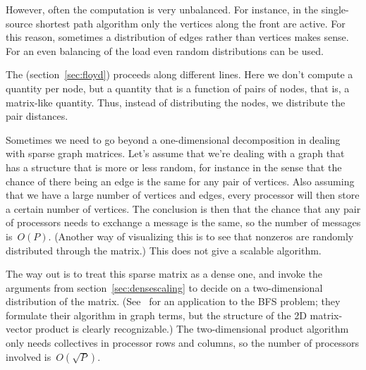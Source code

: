 However, often the computation is very unbalanced. For instance,
in the single-source shortest path algorithm only the vertices
along the front are active. For this reason, sometimes a distribution
of edges rather than vertices makes sense. For an even balancing
of the load even random distributions can be used.

The 
(section~\ref{sec:floyd}) proceeds along different lines. Here we don't
compute a quantity per node, but a quantity that is a function of pairs
of nodes, that is, a matrix-like quantity. Thus, instead of distributing
the nodes, we distribute the pair distances.

Sometimes we need to go beyond a one-dimensional decomposition in dealing
with sparse graph matrices.
Let's assume that we're dealing with a graph that has a structure that
is more or less random, for instance in the sense that the chance of
there being an edge is the same for any pair of vertices. Also
assuming that we have a large number of vertices and edges, every
processor will then store a certain number of vertices. The conclusion
is then that the chance that any pair of processors needs to exchange
a message is the same, so the number of messages is~$O(P)$. (Another
way of visualizing this is to see that nonzeros are randomly
distributed through the matrix.) This does not give a scalable
algorithm.

The way out is to treat this sparse matrix as a dense one, and invoke
the arguments from section~\ref{sec:densescaling} to decide on a
two-dimensional distribution of the matrix.
(See~\cite{Yoo:2005:scalable-bfs} for an application to the \ac{BFS}
problem; they formulate their algorithm in graph terms, but the
structure of the 2D matrix-vector product is clearly recognizable.)
The two-dimensional product algorithm only needs collectives in
processor rows and columns, so the number of processors involved
is~$O(\sqrt P)$.

\endinput

Triadic closure: if $(i,j)\in E$ and $(i,k)\in E$ then $(j,k)\in E$;
example: friend or trust relationship.

A \indextermsub{scale-free}{network}, or one that observes a
\indexterm{power law}, is one where the fraction of nodes with
degree~$k$ is proportional to $k^{-\gamma}$ where $\gamma$ is
positive, typically $2<\gamma<3$. There are claims that graphs such as
the \ac{WWW} obey power laws; this is a claim about the logical
structure, not the physical one, which is very hard to
infer~\cite{Willinger:internet}.

A small-world network can be created by extending an existing network
by \emph{preferential attachment}:
the chance of attaching a new node is proportional to the degree
of the old node.

Power law networks usually have a very small diameter.

